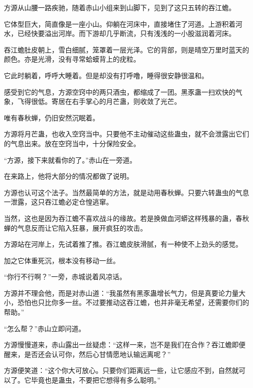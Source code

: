 \begin{this_body}
方源从山腰一路疾驰，随着赤山小组来到山脚下，见到了这只五转的吞江蟾。

它体型巨大，简直像是一座小山。仰躺在河床中，直接堵住了河道。上游积着河水，已经快要溢出河岸。而下游却几乎断流，只有浅浅的一小股滋润着河床。

吞江蟾肚皮朝上，雪白细腻，笼罩着一层光泽。它的背部，则是晴空万里时蓝天的颜色。亦是光滑，没有寻常蛤蟆背上的疣粒。

它此时躺着，呼呼大睡着。但是却没有打呼噜，睡得很安静很温和。

感受到它的气息，方源空窍中的两只酒虫，都缩成了一团。黑豕蛊一扫欢快的气象，飞得很低。寄居在右手掌心的月芒蛊，则收敛了光芒。

唯有春秋蝉，仍旧安然沉眠着。

方源将月芒蛊，也收入空窍当中。只要他不主动催动这些蛊虫，就不会泄露出它们的气息出来。放在空窍当中，十分保险安全。

“方源，接下来就看你的了。”赤山在一旁道。

在来路上，他将大部分的情况都做了说明。

方源也认可这个法子。当然最简单的方法，就是动用春秋蝉。只要六转蛊虫的气息一泄露，这只吞江蟾必定仓惶逃窜。

当然，这也是因为吞江蟾不喜欢战斗的缘故。若是换做血河蟒这样残暴的蛊，春秋蝉的气息反而让它陷入狂暴，展开疯狂的攻击。

方源站在河岸上，先试着推了推。吞江蟾皮肤滑腻，有一种使不上劲头的感觉。

加之它体重死沉，根本没有移动一丝。

“你行不行啊？”一旁，赤城说着风凉话。

方源并不理会他，而是对赤山道：“我虽然有黑豕蛊增长气力，但是真要论力量大小，恐怕也只比你多一丝。不过要推动这吞江蟾，也并非毫无希望，还需要你们的帮助。”

“怎么帮？”赤山立即问道。

方源慢慢道来，赤山露出一丝疑虑：“这样一来，岂不是我们在合作？吞江蟾即便醒来，是否还会认可你，然后心甘情愿地认输远离呢？”

方源便笑道：“这个你大可放心。只要你们距离远一些，让它感应不到，自然就可以了。它毕竟也是蛊虫，不要把它想得有多么聪明。”

\end{this_body}

